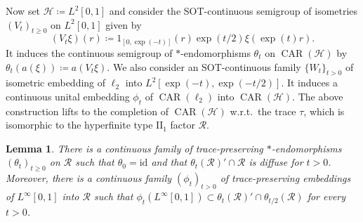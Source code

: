 \documentclass[12pt,nosumlimits,nonamelimits]{amsart}
\newtheorem{lem}[thm]{Lemma}
\theoremstyle{remark}
\newcommand{\cH}{\mathcal{H}}
\newcommand{\cR}{\mathcal{R}}
\newcommand{\id}{\mathrm{id}}
\DeclareMathOperator{\CAR}{CAR}
\begin{document}
Now set $\cH\coloneqq L^2[0,1]$ and 
consider the SOT-continuous semigroup of isometries 
$(V_t)_{t\geq0}$ on $L^2[0,1]$ given by 
\[
(V_t\xi)(r)\coloneqq 1_{[0,\exp(-t)]}(r) \exp(t/2)\xi(\exp(t)r).
\]
It induces the continuous semigroup of $*$-endo\-mor\-phisms  
$\theta_t$ on $\CAR(\cH)$ by $\theta_t(a(\xi))\coloneqq a(V_t\xi)$. 
We also consider an SOT-continuous family $\{W_t\}_{t>0}$ 
of isometric embedding of $\ell_2$ into $L^2[\exp(-t),\exp(-t/2)]$. 
It induces a continuous unital embedding $\phi_t$ of 
$\CAR(\ell_2)$ into $\CAR(\cH)$. 
The above construction lifts to the completion of $\CAR(\cH)$ 
w.r.t.\ the trace $\tau$, which is isomorphic to 
the hyperfinite type $\mathrm{II}_1$ factor $\cR$. 

\begin{lem}\label{lem:car}
There is a continuous family of trace-preserving $*$-endo\-mor\-phisms 
$(\theta_t)_{t\geq0}$ on $\cR$ 
such that $\theta_0=\id$ and 
that $\theta_t(\cR)'\cap\cR$ is diffuse for $t>0$. 
Moreover, there is a continuous family 
$(\phi_t)_{t>0}$ of trace-preserving embeddings of 
$L^\infty[0,1]$ into $\cR$ such that 
$\phi_t(L^\infty[0,1])\subset\theta_t(\cR)'\cap\theta_{t/2}(\cR)$ for every $t>0$. 
\end{lem}
\end{document}
